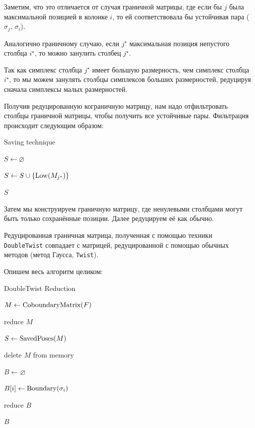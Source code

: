 \documentclass{article}
\begin{document}
Заметим, что это отличается от случая граничной матрицы, где если бы $j$ была максимальной позицией в колонке $i$, то ей соответствовала бы устойчивая пара ($\sigma_{j}$, $\sigma_{i}$).

\begin{lemma}
  Аналогично граничному случаю, если $j^\star$ максимальная позиция непустого столбца $i^\star$, то можно занулить столбец $j^\star$.
\end{lemma}

Так как симплекс столбца $j^\star$ имеет большую размерность, чем симплекс столбца $i^\star$, то мы можем занулять столбцы симплексов больших размерностей, редуцируя сначала симплексы малых размерностей.

Получив редуцированную кограничную матрицу, нам надо отфильтровать столбцы граничной матрицы, чтобы получить все устойчивые пары. Фильтрация происходит следующим образом:

\begin{algorithm}[H]
\caption{Saving technique}
$S \gets \varnothing$

 {
   {
    $S \gets S \cup \{\mathop{\rm Low}(M_{j^\star})\}$
  }
}

\Return $S$
\end{algorithm}

Затем мы конструируем граничную матрицу, где ненулевыми столбцами могут быть только сохранённые позиции. Далее редуцируем её как обычно.

\begin{lemma}
  Редуцированная граничная матрица, полученная с помощью техники \texttt{DoubleTwist} совпадает с матрицей, редуцированной с помощью обычных методов (метод Гаусса, \texttt{Twist}).
\end{lemma}

Опишем весь алгоритм целиком:

\begin{algorithm}[H]
\caption{DoubleTwist Reduction}
$M \gets \mathop{\rm CoboundaryMatrix}(F)$

reduce $M$ 

$S \gets \mathop{\rm SavedPoses}(M)$

delete $M$ from memory

$B \gets \varnothing$

 {
  $B[i] \gets \mathop{\rm Boundary}(\sigma_i)$
}

reduce $B$

\Return $B$
\end{algorithm}
\end{document}
